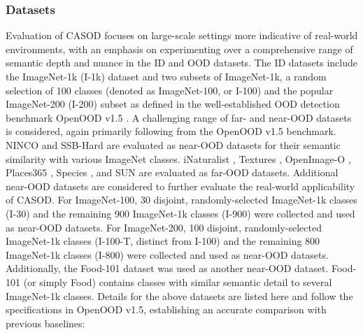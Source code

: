 \subsubsection{Datasets} 
Evaluation of CASOD focuses on large-scale settings more indicative of real-world environments, with an emphasis on experimenting over a comprehensive range of semantic depth and nuance in the ID and OOD datasets. The ID datasets include the ImageNet-1k (I-1k) dataset \cite{deng2009imagenet} and two subsets of ImageNet-1k, a random selection of 100 classes (denoted as ImageNet-100, or I-100) and the popular ImageNet-200 (I-200) subset as defined in the well-established OOD detection benchmark OpenOOD v1.5 \cite{zhang2023openood}. A challenging range of far- and near-OOD datasets \cite{winkens2020contrastive} is considered, again primarily following from the OpenOOD v1.5 benchmark. NINCO \cite{bitterwolf2023or} and SSB-Hard \cite{vaze2021open} are evaluated as near-OOD datasets for their semantic similarity with various ImageNet classes. iNaturalist \cite{van2018inaturalist}, Textures \cite{cimpoi2014describing}, OpenImage-O \cite{wang2022vim}, Places365 \cite{zhou2017places}, Species \cite{hendrycks2019scaling}, and SUN \cite{huang2021mos} are evaluated as far-OOD datasets. Additional near-OOD datasets are considered to further evaluate the real-world applicability of CASOD. For ImageNet-100, 30 disjoint, randomly-selected ImageNet-1k classes (I-30) and the remaining 900 ImageNet-1k classes (I-900) were collected and used as near-OOD datasets. For ImageNet-200, 100 disjoint, randomly-selected ImageNet-1k classes (I-100-T, distinct from I-100) and the remaining 800 ImageNet-1k classes (I-800) were collected and used as near-OOD datasets. Additionally, the Food-101 dataset \cite{bossard2014food,zou2025simlabel} was used as another near-OOD dataset. Food-101 (or simply Food) contains classes with similar semantic detail to several ImageNet-1k classes. Details for the above datasets are listed here and follow the specifications in OpenOOD v1.5, establishing an accurate comparison with previous baselines:
